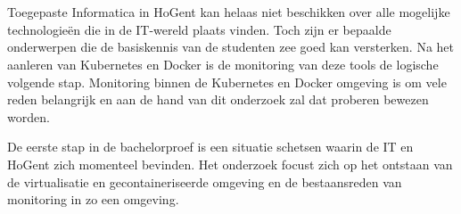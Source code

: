 
%
%

%



\chapter*{}

Toegepaste Informatica in HoGent kan helaas niet beschikken over alle mogelijke technologieën die in de IT-wereld plaats vinden. Toch zijn er bepaalde onderwerpen die de basiskennis van de studenten  zee goed kan versterken. Na het aanleren van Kubernetes en Docker is de monitoring van deze tools de logische volgende stap. Monitoring binnen de Kubernetes en Docker omgeving is om vele reden belangrijk en aan de hand van dit onderzoek zal dat proberen bewezen worden.

De eerste stap in de bachelorproef is een situatie schetsen waarin de IT en HoGent zich momenteel bevinden. Het onderzoek focust zich op het ontstaan van de virtualisatie en gecontaineriseerde omgeving en de bestaansreden van monitoring in zo een omgeving. 


